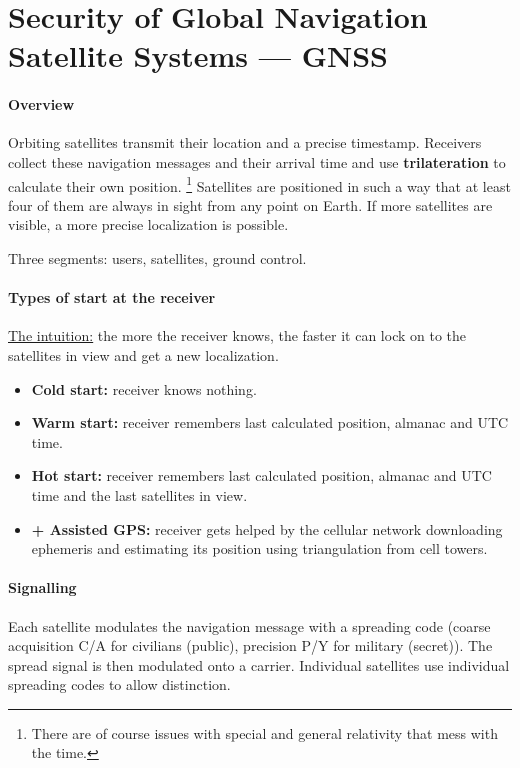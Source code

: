 \section{Security of Global Navigation Satellite Systems --- GNSS}

\paragraph{Overview}
Orbiting satellites transmit their location and a precise timestamp.
Receivers collect these navigation messages and their arrival time and use \textbf{trilateration} to calculate their own position.
\footnote{There are of course issues with special and general relativity that mess with the time.}
Satellites are positioned in such a way that at least four of them are always in sight from any point on Earth. If more satellites are visible, a more precise localization is possible.

Three segments: users, satellites, ground control.

\paragraph{Types of start at the receiver}
\underline{The intuition:} the more the receiver knows, the faster it can lock on to the satellites in view and get a new localization.
\begin{itemize}
	\item \textbf{Cold start:} receiver knows nothing.
	\item \textbf{Warm start:} receiver remembers last calculated position, almanac and UTC time.
	\item \textbf{Hot start:} receiver remembers last calculated position, almanac and UTC time and the last satellites in view.
	\item \textbf{+ Assisted GPS:} receiver gets helped by the cellular network downloading ephemeris and estimating its position using triangulation from cell towers.
\end{itemize}

\paragraph{Signalling}
Each satellite modulates the navigation message with a spreading code (coarse acquisition C/A for civilians (public), precision P/Y for military (secret)). The spread signal is then modulated onto a carrier. Individual satellites use individual spreading codes to allow distinction.

